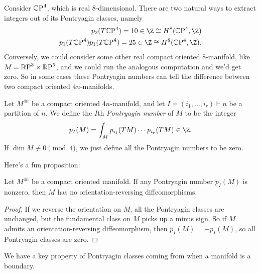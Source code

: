 \documentclass[11pt]{book}
\begin{document}
\begin{example} Consider ${\mathbb{C}\text{P}}^4$, which is real 8-dimensional. There are two natural ways to extract integers out of its Pontryagin classes, namely
\begin{align*}
    p_2(T\CP^4) = 10\in \Z \cong H^8(\CP^4,\Z) \\
    p_1(T\CP^4)p_1(T\CP^4) = 25 \in \Z \cong H^8(\CP^4,\Z).
\end{align*}
Conversely, we could consider some other real compact oriented 8-manifold, like $M = {\mathbb{R}\text{P}}^3 \times {\mathbb{R}\text{P}}^5$, and we could run the analogous computation and we'd get zero. So in some cases these Pontryagin numbers can tell the difference between two compact oriented $4n$-manifolds.
\end{example}

\begin{definition}\label{def:Pontryagin-numbers} Let $M^{4n}$ be a compact oriented $4n$-manifold, and let $I = (i_1, \ldots, i_r) \vdash n$ be a partition of $n$. We define the $I$th \emph{Pontryagin number} of $M$ to be the integer
\begin{align*}
    p_I(M) = \int_M p_{i_1}(TM) \cdots p_{i_r}(TM) \in \Z.
\end{align*}
If $\dim M \not\equiv 0 \pmod{4}$, we just define all the Pontryagin numbers to be zero.
\end{definition}

Here's a fun proposition:

\begin{proposition}
Let $M^{4n}$ be a compact oriented manifold. If any Pontryagin number $p_I(M)$ is nonzero, then $M$ has no orientation-reversing diffeomorphisms.
\end{proposition}
\begin{proof} If we reverse the orientation on $M$, all the Pontryagin classes are unchanged, but the fundamental class on $M$ picks up a minus sign. So if $M$ admits an orientation-reversing diffeomorphism, then $p_I(M) = - p_I(M)$, so all Pontryagin classes are zero.
\end{proof}

We have a key property of Pontryagin classes coming from when a manifold is a boundary. 
\end{document}
